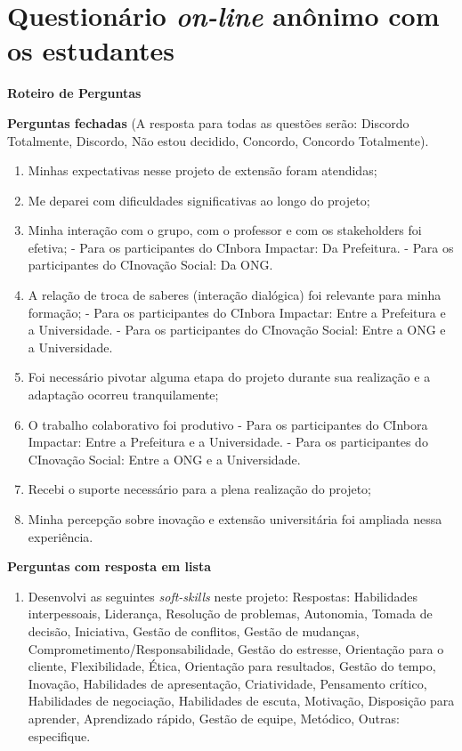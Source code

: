 \chapter{Questionário \textit{on-line} anônimo com os estudantes}
\textbf{Roteiro de Perguntas}
\par\vspace{1\baselineskip}
\textbf{Perguntas fechadas} (A resposta para todas as questões serão: Discordo Totalmente, Discordo, Não estou decidido, Concordo, Concordo Totalmente).
\begin{enumerate}
    \item Minhas expectativas nesse projeto de extensão foram atendidas;
    \item Me deparei com dificuldades significativas ao longo do projeto;
    \item Minha interação com o grupo, com o professor e com os stakeholders foi efetiva; 
      - Para os participantes do CInbora Impactar: Da Prefeitura.
    - Para os participantes do CInovação Social: Da \gls{ONG}.
    \item A relação de troca de saberes (interação dialógica) foi relevante para minha formação;
     - Para os participantes do CInbora Impactar: Entre a Prefeitura e a Universidade.
    - Para os participantes do CInovação Social: Entre a \gls{ONG} e a Universidade.
    \item Foi necessário pivotar alguma etapa do projeto durante sua realização e a adaptação ocorreu tranquilamente;
    \item O trabalho colaborativo foi produtivo
     - Para os participantes do CInbora Impactar: Entre a Prefeitura e a Universidade.
    - Para os participantes do CInovação Social: Entre a \gls{ONG} e a Universidade.
    \item Recebi o suporte necessário para a plena realização do projeto;
    \item Minha percepção sobre inovação e extensão universitária foi ampliada nessa experiência.
\end{enumerate}
\par\vspace{1\baselineskip}
\textbf{Perguntas com resposta em lista}
\begin{enumerate}
    \item Desenvolvi as seguintes \textit{soft-skills }neste projeto:
Respostas: 
Habilidades interpessoais, Liderança, Resolução de problemas, Autonomia, Tomada de decisão, Iniciativa, Gestão de conflitos, Gestão de mudanças, Comprometimento/Responsabilidade, Gestão do estresse, Orientação para o cliente, Flexibilidade, Ética, Orientação para resultados, Gestão do tempo, Inovação, Habilidades de apresentação, Criatividade, Pensamento crítico, Habilidades de negociação, Habilidades de escuta, Motivação, Disposição para aprender, Aprendizado rápido, Gestão de equipe, Metódico, Outras: especifique.
\end{enumerate}
